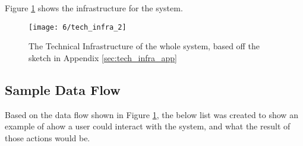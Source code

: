 \documentclass[../dissertation.tex]{subfiles}
\begin{document}
Figure \ref{fig:techinfra} shows the infrastructure for the system.

\begin{figure}[H]
    \centering
    \texttt{[image: 6/tech\_infra\_2]}
    \caption{The Technical Infrastructure of the whole system, based off the sketch in Appendix \ref{sec:tech_infra_app}}
    \label{fig:techinfra}
\end{figure}

\subsection{Sample Data Flow}

Based on the data flow shown in Figure \ref{fig:techinfra}, the below list was created to show an example of ahow a user could interact with the system, and what the result of those actions would be.
\end{document}
